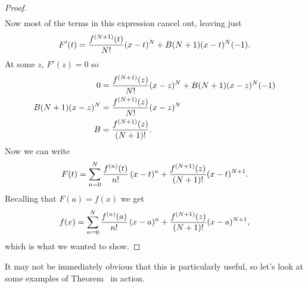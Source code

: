 \begin{proof}
\begin{align*}
\end{align*}
Now most of the terms in this expression cancel out,
leaving just
$$F'(t) = {f^{(N+1)}(t)\over N!}(x-t)^N+B(N+1)(x-t)^N(-1).$$
At some $z$, $F'(z)=0$ so
\begin{align*}
  0&={f^{(N+1)}(z)\over N!}(x-z)^N+B(N+1)(x-z)^N(-1) \\
  B(N+1)(x-z)^N&={f^{(N+1)}(z)\over N!}(x-z)^N \\
  B&={f^{(N+1)}(z)\over (N+1)!}. \\
\end{align*}
Now we can write 
$$
  F(t)=\sum_{n=0}^N{f^{(n)}(t)\over n!}\,(x-t)^n + 
  {f^{(N+1)}(z)\over (N+1)!}(x-t)^{N+1}.
$$
Recalling that $F(a)=f(x)$ we get
$$
  f(x)=\sum_{n=0}^N{f^{(n)}(a)\over n!}\,(x-a)^n + 
  {f^{(N+1)}(z)\over (N+1)!}(x-a)^{N+1},
$$
which is what we wanted to show.
\end{proof}

It may not be immediately obvious that this is particularly useful, so
let's look at some examples of Theorem~
in action.

